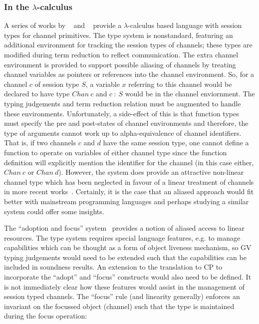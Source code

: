 \documentclass{mprop}
\begin{document}
\subsubsection{In the \texorpdfstring{$\lambda$}{lambda}-calculus}
\label{sec:lam}

A series of works by \citeauthor{Gay:2003:STI}~\cite{Gay:2003:STI} and
\citeauthor{Vasconcelos:2006:TCM}~\cite{Vasconcelos:2006:TCM} provide a
$\lambda$-calculus based language with session types for channel
primitives. The type system is nonstandard, featuring an additional
environment for tracking the session types of channels; these types are
modified during term reduction to reflect communication. The extra channel
environment is provided to support possible aliasing of channels by treating
channel variables as pointers or references into the channel environment. So,
for a channel $c$ of session type $S$, a variable $x$ referring to this
channel would be declared to have type $Chan~c$ and $c~:~S$ would be in the
channel enviornment. The typing judgements and term reduction relation must be
augmented to handle these environments. Unfortunately, a side-effect of this
is that function types must specify the pre and post-states of channel
environments and therefore, the type of arguments cannot work up to
alpha-equivalence of channel identifiers. That is, if two channels $c$ and $d$
have the same session type, one cannot define a function to operate on
variables of either channel type since the function definition will explicitly
mention the identifier for the channel (in this case either, $Chan~c$ or
$Chan~d$). However, the system does provide an attractive non-linear channel
type which has been neglected in favour of a linear treatment of channels in
more recent
works~\cite{Gay:2010:LAST,Mazurak:2010:LCC,Wadler:2014}. Certainly, it is the
case that an aliased approach would fit better with mainstream programming
languages and perhaps studying a similar system could offer some insights.

The ``adoption and focus'' system~\cite{Fahndrich:2002} provides a notion of
aliased access to linear resources. The type system requires special language
features, e.g. to manage capabilities which can be thought as a form of object
liveness mechanism, so GV typing judgements would need to be extended such
that the capabilities can be included in soundness results. An extension to the
translation to CP to incorporate the ``adopt'' and ``focus'' constructs would
also need to be defined. It is not immediately clear how these features would
assist in the management of session typed channels. The ``focus'' rule (and
linearity generally) enforces an invariant on the focussed object (channel)
such that the type is maintained during the focus operation:

\end{document}
